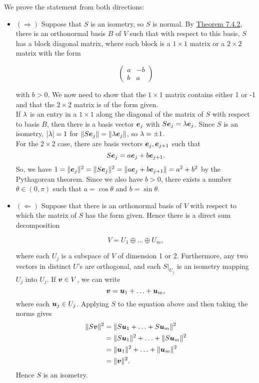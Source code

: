 \documentclass{report}
\begin{document}
	\begin{myproof} We prove the statement from both directions:
		\begin{itemize}
			\item $(\Rightarrow)$ Suppose that $S$ is an isometry, so $S$ is normal. By \hyperref[sec:Thm742]{Theorem 7.4.2}, there is an orthonormal basis $B$ of $V$ such that with respect to this basis, $S$ has a block diagonal matrix, where each block is a $1\times 1$ matrix or a $2\times 2$ matrix with the form
			
			$$\begin{pmatrix}
				a & -b \\ b & a
			\end{pmatrix}$$
			
			with $b>0$. We now need to show that the $1\times 1$ matrix contains either 1 or -1 and that the $2\times 2$ matrix is of the form given.\\
			
			If $\lambda$ is an entry in a $1\times 1$ along the diagonal of the matrix of $S$ with respect to basis $B$, then there is a basis vector $\boldsymbol{e}_j$ with $S\boldsymbol{e}_j=\lambda\boldsymbol{e}_j$. Since $S$ is an isometry, $|\lambda|=1$ for $\|S\boldsymbol{e}_j\|=\|\lambda\boldsymbol{e}_j\|$, so $\lambda=\pm 1$.\\
			
			For the $2\times 2$ case, there are basis vectors $\boldsymbol{e}_j,\boldsymbol{e}_{j+1}$ such that
			$$S\boldsymbol{e}_j=a\boldsymbol{e}_j+b\boldsymbol{e}_{j+1}.$$
			So, we have $1=\|\boldsymbol{e}_j\|^2=\|S\boldsymbol{e}_j\|^2=\|a\boldsymbol{e}_j+b\boldsymbol{e}_{j+1}\|=a^2+b^2$ by the Pythagorean theorem. Since we also have $b>0$, there exists a number $\theta\in(0,\pi)$ such that $a=\cos\theta$ and $b=\sin\theta$.
			\item $(\Leftarrow)$ Suppose that there is an orthonormal basis of $V$ with respect to which the matrix of $S$ has the form given. Hence there is a direct sum decomposition
			
			$$V=U_1\oplus\ldots\oplus U_m,$$
			
			where each $U_j$ is a subspace of $V$ of dimension 1 or 2. Furthermore, any two vectors in distinct $U$'s are orthogonal, and each $S|_{U_j}$ is an isometry mapping $U_j$ into $U_j$. If $\boldsymbol{v}\in V$, we can write 
			$$\boldsymbol{v}=\boldsymbol{u}_1+\ldots+\boldsymbol{u}_m,$$
			where each $\boldsymbol{u}_j\in U_j$. Applying $S$ to the equation above and then taking the norms gives
			\begin{align*}
				\|S\boldsymbol{v}\|^2&=\|S\boldsymbol{u}_1+\ldots+S\boldsymbol{u}_m\|^2\\
				&=\|S\boldsymbol{u}_1\|^2+\ldots+\|S\boldsymbol{u}_m\|^2\\
				&=\|\boldsymbol{u}_1\|^2+\ldots+\|\boldsymbol{u}_m\|^2\\
				&=\|\boldsymbol{v}\|^2.
			\end{align*}
			Hence $S$ is an isometry.
		\end{itemize}
	\end{myproof}
	
\end{document}
